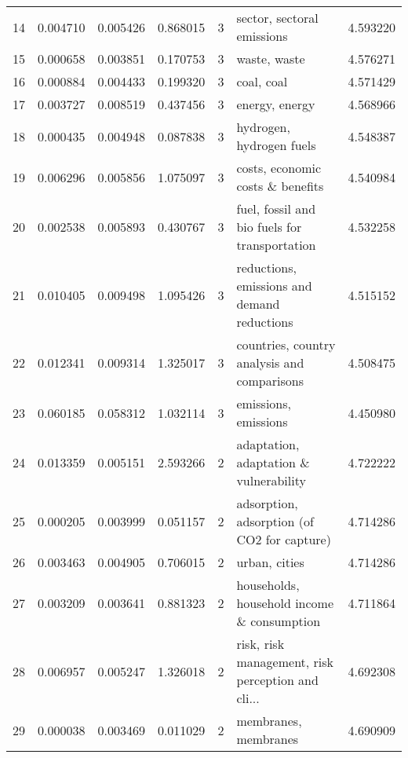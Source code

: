 \begin{tabular}{lrrrrlr}
14  &    0.004710 &  0.005426 &        0.868015 &           3 &                         sector, sectoral emissions &  4.593220 \\
15  &    0.000658 &  0.003851 &        0.170753 &           3 &                                       waste, waste &  4.576271 \\
16  &    0.000884 &  0.004433 &        0.199320 &           3 &                                         coal, coal &  4.571429 \\
17  &    0.003727 &  0.008519 &        0.437456 &           3 &                                     energy, energy &  4.568966 \\
18  &    0.000435 &  0.004948 &        0.087838 &           3 &                           hydrogen, hydrogen fuels &  4.548387 \\
19  &    0.006296 &  0.005856 &        1.075097 &           3 &                   costs, economic costs \& benefits &  4.540984 \\
20  &    0.002538 &  0.005893 &        0.430767 &           3 &      fuel, fossil and bio fuels for transportation &  4.532258 \\
21  &    0.010405 &  0.009498 &        1.095426 &           3 &        reductions, emissions and demand reductions &  4.515152 \\
22  &    0.012341 &  0.009314 &        1.325017 &           3 &        countries, country analysis and comparisons &  4.508475 \\
23  &    0.060185 &  0.058312 &        1.032114 &           3 &                               emissions, emissions &  4.450980 \\
24  &    0.013359 &  0.005151 &        2.593266 &           2 &             adaptation, adaptation \& vulnerability &  4.722222 \\
25  &    0.000205 &  0.003999 &        0.051157 &           2 &        adsorption, adsorption (of CO2 for capture) &  4.714286 \\
26  &    0.003463 &  0.004905 &        0.706015 &           2 &                                      urban, cities &  4.714286 \\
27  &    0.003209 &  0.003641 &        0.881323 &           2 &         households, household income \& consumption &  4.711864 \\
28  &    0.006957 &  0.005247 &        1.326018 &           2 &  risk, risk management, risk perception and cli... &  4.692308 \\
29  &    0.000038 &  0.003469 &        0.011029 &           2 &                               membranes, membranes &  4.690909 \\

\end{tabular}

